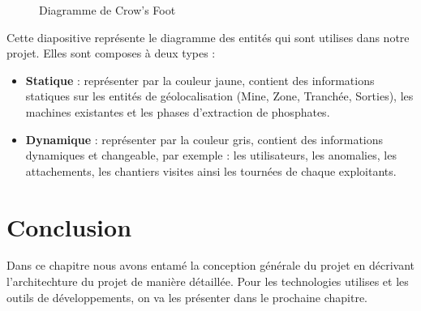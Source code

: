 \begin{figure}[H]
	\caption{\label{fig:my-label} Diagramme de Crow's Foot}
\end{figure}

Cette diapositive repr\'esente le diagramme des entit\'es qui sont utilises dans notre projet. Elles sont composes \`a deux types :
\begin{itemize}
\item \textbf{Statique} : repr\'esenter par la couleur jaune, contient des informations statiques sur les entit\'es de g\'eolocalisation (Mine, Zone, Tranch\'ee, Sorties), les machines existantes et les phases d'extraction de phosphates.
\item \textbf{Dynamique} : repr\'esenter par la couleur gris, contient des informations dynamiques et changeable, par exemple : les utilisateurs, les anomalies, les attachements, les chantiers visites ainsi les tourn\'ees de chaque exploitants.
\end{itemize}


\section{Conclusion}

Dans ce chapitre nous avons entam\'e la conception g\'en\'erale du projet en d\'ecrivant l'architechture du projet de mani\`ere d\'etaill\'ee. Pour les technologies utilises et les outils de d\'eveloppements, on va les pr\'esenter dans le prochaine chapitre.

